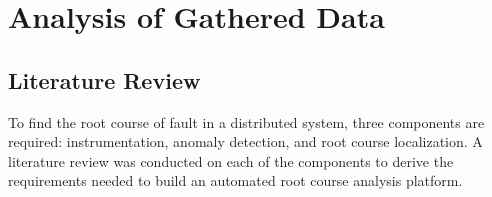 \section{Analysis of Gathered Data}

\subsection{Literature Review}

To find the root course of fault in a distributed system, three components are required: instrumentation, anomaly detection, and root course localization. A literature review was conducted on each of the components to derive the requirements needed to build an automated root course analysis platform.



